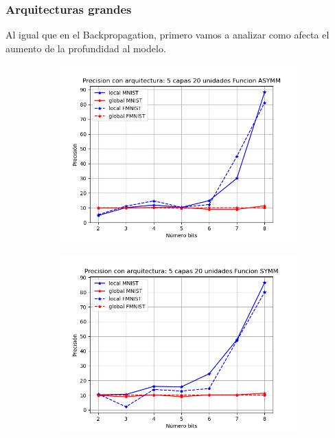 \subsubsection{Arquitecturas grandes}

Al igual que en el Backpropagation, primero vamos a analizar como afecta el aumento de la profundidad al modelo.
\begin{figure}[H]
    \centering
    \begin{subfigure}[H]{0.475\textwidth}
    \includegraphics[width=\textwidth]{imagenes/HSIC/Precision con arquitectura: 5 capas 20 unidades Funcion ASYMM.png}
    \end{subfigure}
    \begin{subfigure}[H]{0.475\textwidth}
    \includegraphics[width=\textwidth]{imagenes/HSIC/Precision con arquitectura: 5 capas 20 unidades Funcion SYMM.png}
    \end{subfigure}

\end{figure}
